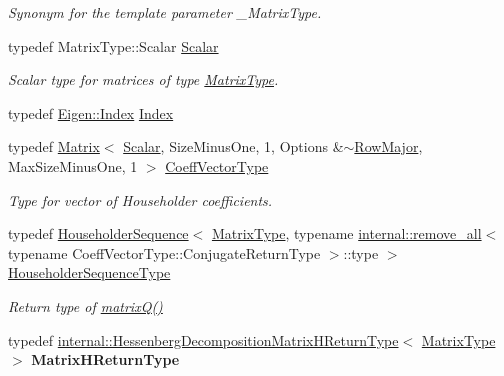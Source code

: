 \begin{DoxyCompactItemize}
\begin{DoxyCompactList}\small\item\em Synonym for the template parameter {\ttfamily \+\_\+\+Matrix\+Type}. \end{DoxyCompactList}\item 
\mbox{\label{group___eigenvalues___module_a9420c36226cae7d92da8308a3f97ac2f}} 
typedef Matrix\+Type\+::\+Scalar \hyperlink{group___eigenvalues___module_a9420c36226cae7d92da8308a3f97ac2f}{Scalar}
\begin{DoxyCompactList}\small\item\em Scalar type for matrices of type \hyperlink{group___eigenvalues___module_a93a611350a7db9d1da18f2c828ecea9f}{Matrix\+Type}. \end{DoxyCompactList}\item 
typedef \hyperlink{namespace_eigen_a62e77e0933482dafde8fe197d9a2cfde}{Eigen\+::\+Index} \hyperlink{group___eigenvalues___module_a8e287ac222f53e2c8ce82faa43e95ac6}{Index}
\item 
typedef \hyperlink{group___core___module_class_eigen_1_1_matrix}{Matrix}$<$ \hyperlink{group___eigenvalues___module_a9420c36226cae7d92da8308a3f97ac2f}{Scalar}, Size\+Minus\+One, 1, Options \&$\sim$\hyperlink{group__enums_ggaacded1a18ae58b0f554751f6cdf9eb13acfcde9cd8677c5f7caf6bd603666aae3}{Row\+Major}, Max\+Size\+Minus\+One, 1 $>$ \hyperlink{group___eigenvalues___module_a567f99f3770365777b67bf9832b6fac1}{Coeff\+Vector\+Type}
\begin{DoxyCompactList}\small\item\em Type for vector of Householder coefficients. \end{DoxyCompactList}\item 
\mbox{\label{group___eigenvalues___module_a7c1188cd5d8f550c8941df75a50a7d08}} 
typedef \hyperlink{group___householder___module_class_eigen_1_1_householder_sequence}{Householder\+Sequence}$<$ \hyperlink{group___eigenvalues___module_a93a611350a7db9d1da18f2c828ecea9f}{Matrix\+Type}, typename \hyperlink{struct_eigen_1_1internal_1_1remove__all}{internal\+::remove\+\_\+all}$<$ typename Coeff\+Vector\+Type\+::\+Conjugate\+Return\+Type $>$\+::type $>$ \hyperlink{group___eigenvalues___module_a7c1188cd5d8f550c8941df75a50a7d08}{Householder\+Sequence\+Type}
\begin{DoxyCompactList}\small\item\em Return type of \hyperlink{group___eigenvalues___module_a346441e4902a58d43d698ac3da6ff791}{matrix\+Q()} \end{DoxyCompactList}\item 
\mbox{\label{group___eigenvalues___module_accca4cb1b5d78bc41defe77f01b4aada}} 
typedef \hyperlink{group___eigenvalues___module_struct_eigen_1_1internal_1_1_hessenberg_decomposition_matrix_h_return_type}{internal\+::\+Hessenberg\+Decomposition\+Matrix\+H\+Return\+Type}$<$ \hyperlink{group___eigenvalues___module_a93a611350a7db9d1da18f2c828ecea9f}{Matrix\+Type} $>$ {\bfseries Matrix\+H\+Return\+Type}
\end{DoxyCompactItemize}
